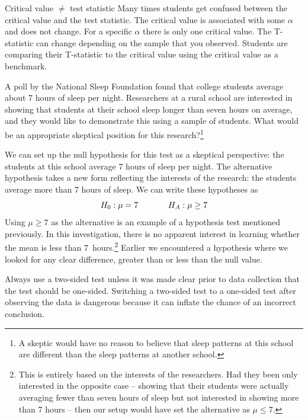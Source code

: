 \begin{caution}{Critical value $\neq$ test statistic}
{Many times students get confused between the critical value and the test statistic. The critical value is associated with some $\alpha$ and does not change. For a specific $\alpha$ there is only one critical value. The T-statistic can change depending on the sample that you observed. Students are comparing their T-statistic to the critical value using the critical value as a benchmark.} 
\end{caution}

\begin{exercise} \label{skepticalPerspOfRuralSchoolSleepExercise}
A poll by the National Sleep Foundation found that college students average about 7 hours of sleep per night. Researchers at a rural school are interested in showing that students at their school sleep longer than seven hours on average, and they would like to demonstrate this using a sample of students. What would be an appropriate skeptical position for this research?\footnote{A skeptic would have no reason to believe that sleep patterns at this school are different than the sleep patterns at another school.}
\end{exercise}


We can set up the null hypothesis for this test as a skeptical perspective: the students at this school average 7 hours of sleep per night. The alternative hypothesis takes a new form reflecting the interests of the research: the students average more than 7 hours of sleep. We can write these hypotheses as
\[H_0: \mu = 7 \hspace{0.5in} H_A: \mu \geq 7\]
Using $\mu \geq 7$ as the alternative is an example of a  hypothesis test mentioned previously. In this investigation, there is no apparent interest in learning whether the mean is less than 7~hours.\footnote{This is entirely based on the interests of the researchers. Had they been only interested in the opposite case -- showing that their students were actually averaging fewer than seven hours of sleep but not interested in showing more than 7 hours -- then our setup would have set the alternative as $\mu \leq 7$.} Earlier we encountered a  hypothesis where we looked for any clear difference, greater than or less than the null value.

Always use a two-sided test unless it was made clear prior to data collection that the test should be one-sided. Switching a two-sided test to a one-sided test after observing the data is dangerous because it can inflate the chance of an incorrect conclusion.

